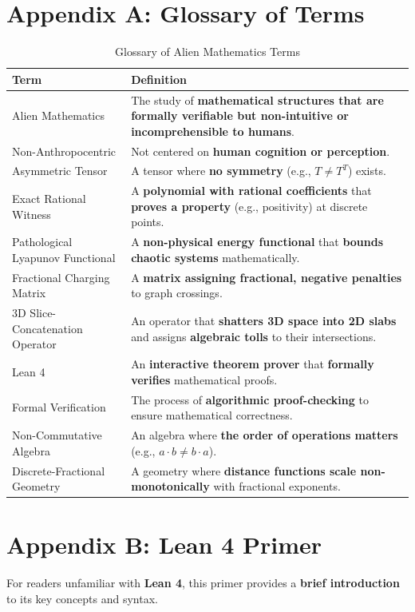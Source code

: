 \documentclass[11pt, a4paper]{article}
\begin{document}
\section*{Appendix A: Glossary of Terms}
\begin{table}[h]
\centering
\caption{Glossary of Alien Mathematics Terms}
\label{tab:glossary}
\begin{tabular}{|>{\raggedright\arraybackslash}p{4cm}|>{\raggedright\arraybackslash}p{8cm}|}
\hline
\textbf{Term} & \textbf{Definition} \\
\hline
Alien Mathematics & The study of \textbf{mathematical structures that are formally verifiable but non-intuitive or incomprehensible to humans}. \\
\hline
Non-Anthropocentric & Not centered on \textbf{human cognition or perception}. \\
\hline
Asymmetric Tensor & A tensor where \textbf{no symmetry} (e.g., \(T \neq T^T\)) exists. \\
\hline
Exact Rational Witness & A \textbf{polynomial with rational coefficients} that \textbf{proves a property} (e.g., positivity) at discrete points. \\
\hline
Pathological Lyapunov Functional & A \textbf{non-physical energy functional} that \textbf{bounds chaotic systems} mathematically. \\
\hline
Fractional Charging Matrix & A \textbf{matrix assigning fractional, negative penalties} to graph crossings. \\
\hline
3D Slice-Concatenation Operator & An operator that \textbf{shatters 3D space into 2D slabs} and assigns \textbf{algebraic tolls} to their intersections. \\
\hline
Lean 4 & An \textbf{interactive theorem prover} that \textbf{formally verifies} mathematical proofs. \\
\hline
Formal Verification & The process of \textbf{algorithmic proof-checking} to ensure mathematical correctness. \\
\hline
Non-Commutative Algebra & An algebra where \textbf{the order of operations matters} (e.g., \(a \cdot b \neq b \cdot a\)). \\
\hline
Discrete-Fractional Geometry & A geometry where \textbf{distance functions scale non-monotonically} with fractional exponents. \\
\hline
\end{tabular}
\end{table}

\newpage
\section*{Appendix B: Lean 4 Primer}
For readers unfamiliar with \textbf{Lean 4}, this primer provides a \textbf{brief introduction} to its key concepts and syntax.
\end{document}
